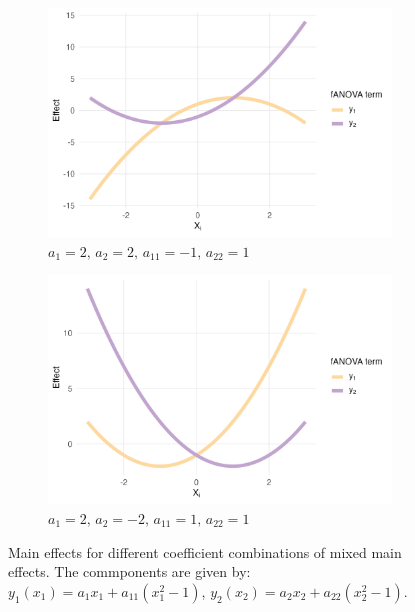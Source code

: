 \begin{figure}[htpb]
    \begin{subfigure}[t]{0.49\textwidth}
        \centering
        \includegraphics[width=\textwidth]{images/experiment_section/mixed_a1p20_a2p20_a11m10_a22p10_a12p00_rhop00_main.png}
        \caption{$a_1=2,\, a_2=2,\, a_{11}=-1,\, a_{22}=1$}
        \label{fig:mixed_rho_0_panel3}
    \end{subfigure}%
    \hfill
    \begin{subfigure}[t]{0.49\textwidth}
        \centering
        \includegraphics[width=\textwidth]{images/experiment_section/mixed_a1p20_a2m20_a11p10_a22p10_a12p00_rhop00_main.png}
        \caption{$a_1=2,\, a_2=-2,\, a_{11}=1,\, a_{22}=1$}
        \label{fig:mixed_rho_0_panel4}
    \end{subfigure}

    \caption{Main effects for different coefficient combinations of mixed main effects. The commponents are given by: $y_1(x_1) = a_1 x_1 + a_{11}(x_1^2 - 1)$, $y_2(x_2) = a_2 x_2 + a_{22}(x_2^2 - 1)$.}
    \label{fig:mixed_main_effects}
\end{figure}




